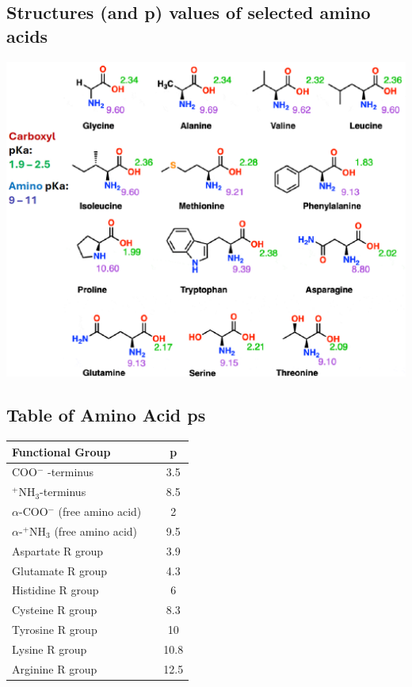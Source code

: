 \documentclass[10pt]{article}
\newcommand{\ka}{\text{$K_\text{a}$}}
\begin{document}
\subsection*{Structures (and p\ka) values of selected amino acids}
\begin{center}
    \includegraphics*[width=\textwidth]{L1_11.png}
\end{center}
\subsection*{Table of Amino Acid p\ka s}
\begin{center}
    \begin{tabular}{|lp{1cm}c|}
        \hline
        \textbf{Functional Group} &  & \textbf{p\ka} \\ \hline
        COO$^-$ -terminus &  & 3.5 \\ \hline
        $^+$NH$_3$-terminus &  & 8.5 \\ \hline
        $\alpha$-COO$^-$ (free amino acid) &  & 2 \\ \hline
        $\alpha$-$^+$NH$_3$ (free amino acid) &  & 9.5 \\ \hline
        Aspartate R group &  & 3.9 \\ \hline
        Glutamate R group &  & 4.3 \\ \hline
        Histidine R group &  & 6 \\ \hline
        Cysteine R group &  & 8.3 \\ \hline
        Tyrosine R group &  & 10 \\ \hline
        Lysine R group &  & 10.8 \\ \hline
        Arginine R group &  & 12.5 \\ \hline
        \end{tabular}
\end{center}
\end{document}
